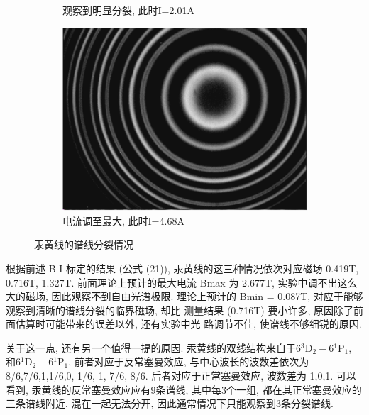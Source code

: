 \documentclass[12pt,a4paper]{article}
\begin{document}
\begin{figure}[H]
\begin{subfigure}[b]{0.3\textwidth}
      \caption{观察到明显分裂, 此时I=2.01A}
    \end{subfigure}
    \hfill
    \begin{subfigure}[b]{0.3\textwidth}
      \centering
      \includegraphics[width=\textwidth]{4.68yy.png}
      \caption{电流调至最大, 此时I=4.68A}
    \end{subfigure}
    \caption{汞黄线的谱线分裂情况}
  \end{figure}
  根据前述 B-I 标定的结果 (公式 (21)), 汞黄线的这三种情况依次对应磁场 0.419T,
  0.716T, 1.327T. 前面理论上预计的最大电流 Bmax 为 2.677T, 实验中调不出这么大的磁场, 因此观察不到自由光谱极限. 
  理论上预计的 Bmin = 0.087T, 对应于能够观察到清晰的谱线分裂的临界磁场, 却比
  测量结果 (0.716T) 要小许多, 原因除了前面估算时可能带来的误差以外, 还有实验中光
  路调节不佳, 使谱线不够细锐的原因. 
  
  关于这一点, 还有另一个值得一提的原因. 汞黄线的双线结构来自于$6{ }^{3} \mathrm{D}_{2}-6{ }^{1} \mathrm{P}_{1}$, 和$6{ }^{1} \mathrm{D}_{2}-6{ }^{1} \mathrm{P}_{1}$, 
  前者对应于反常塞曼效应, 与中心波长的波数差依次为8/6,7/6,1,1/6,0,-1/6,-1,-7/6,-8/6. 后者对应于正常塞曼效应, 波数差为-1,0,1. 可以看到, 汞黄线的反常塞曼效应应有9条谱线, 其中每3个一组, 都在其正常塞曼效应的三条谱线附近, 混在一起无法分开, 
  因此通常情况下只能观察到3条分裂谱线. 
  
\end{document}

